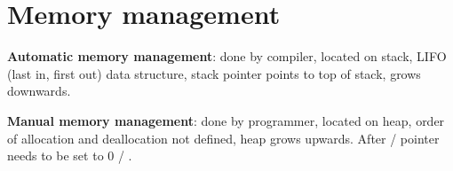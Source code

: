 \section{Memory management}
    \textbf{Automatic memory management}: done by compiler, located on stack, LIFO (last in, first out) data structure, stack pointer points to top of stack, grows downwards.

    \textbf{Manual memory management}: done by programmer, located on heap, order of allocation and deallocation not defined, heap grows upwards. After / pointer needs to be set to 0 / .
